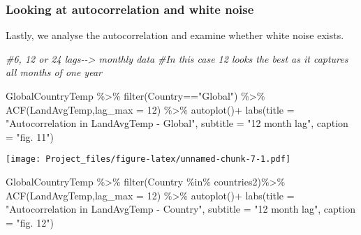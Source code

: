 \documentclass[
]{article}
\newenvironment{Shaded}{\begin{snugshade}}{\end{snugshade}}
\newcommand{\AttributeTok}[1]{\textcolor[rgb]{0.77,0.63,0.00}{#1}}
\newcommand{\CommentTok}[1]{\textcolor[rgb]{0.56,0.35,0.01}{\textit{#1}}}
\newcommand{\DecValTok}[1]{\textcolor[rgb]{0.00,0.00,0.81}{#1}}
\newcommand{\FunctionTok}[1]{\textcolor[rgb]{0.00,0.00,0.00}{#1}}
\newcommand{\NormalTok}[1]{#1}
\newcommand{\SpecialCharTok}[1]{\textcolor[rgb]{0.00,0.00,0.00}{#1}}
\newcommand{\StringTok}[1]{\textcolor[rgb]{0.31,0.60,0.02}{#1}}
\begin{document}
\hypertarget{looking-at-autocorrelation-and-white-noise}{%
\subsubsection{Looking at autocorrelation and white
noise}\label{looking-at-autocorrelation-and-white-noise}}

Lastly, we analyse the autocorrelation and examine whether white noise
exists.

\begin{Shaded}
\begin{Highlighting}[]
\CommentTok{\#6, 12 or 24 lags{-}{-}\textgreater{} monthly data}
\CommentTok{\#In this case 12 looks the best as it captures all months of one year}

\NormalTok{GlobalCountryTemp }\SpecialCharTok{\%\textgreater{}\%} \FunctionTok{filter}\NormalTok{(Country}\SpecialCharTok{==}\StringTok{"Global"}\NormalTok{) }\SpecialCharTok{\%\textgreater{}\%} \FunctionTok{ACF}\NormalTok{(LandAvgTemp,}\AttributeTok{lag\_max =} \DecValTok{12}\NormalTok{) }\SpecialCharTok{\%\textgreater{}\%} \FunctionTok{autoplot}\NormalTok{()}\SpecialCharTok{+}
  \FunctionTok{labs}\NormalTok{(}\AttributeTok{title =} \StringTok{"Autocorrelation in LandAvgTemp {-} Global"}\NormalTok{,}
       \AttributeTok{subtitle =} \StringTok{"12 month lag"}\NormalTok{,}
       \AttributeTok{caption =} \StringTok{"fig. 11"}\NormalTok{)}
\end{Highlighting}
\end{Shaded}

\texttt{[image: Project\_files/figure-latex/unnamed-chunk-7-1.pdf]}

\begin{Shaded}
\begin{Highlighting}[]
\NormalTok{GlobalCountryTemp }\SpecialCharTok{\%\textgreater{}\%} 
  \FunctionTok{filter}\NormalTok{(Country }\SpecialCharTok{\%in\%}\NormalTok{ countries2)}\SpecialCharTok{\%\textgreater{}\%} \FunctionTok{ACF}\NormalTok{(LandAvgTemp,}\AttributeTok{lag\_max =} \DecValTok{12}\NormalTok{) }\SpecialCharTok{\%\textgreater{}\%} \FunctionTok{autoplot}\NormalTok{()}\SpecialCharTok{+}
  \FunctionTok{labs}\NormalTok{(}\AttributeTok{title =} \StringTok{"Autocorrelation in LandAvgTemp {-} Country"}\NormalTok{,}
       \AttributeTok{subtitle =} \StringTok{"12 month lag"}\NormalTok{,}
       \AttributeTok{caption =} \StringTok{"fig. 12"}\NormalTok{)}
\end{Highlighting}
\end{Shaded}
\end{document}
